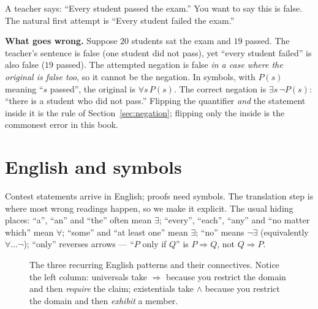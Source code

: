 \begin{example}\label{ex:naive-negation}
A teacher says: ``Every student passed the exam.'' You want to say this is false. The
natural first attempt is ``Every student failed the exam.''
\par\smallskip
\textbf{What goes wrong.} Suppose $20$ students sat the exam and $19$ passed. The teacher's
sentence is false (one student did not pass), yet ``every student failed'' is also false
($19$ passed). The attempted negation is false \emph{in a case where the original is false too},
so it cannot be the negation. In symbols, with $P(s)$ meaning ``$s$ passed'', the original is
$\forall s\,P(s)$. The correct negation is $\exists s\,\neg P(s)$: ``there is a student who did
not pass.'' Flipping the quantifier \emph{and} the statement inside it is the rule of
Section~\ref{sec:negation}; flipping only the inside is the commonest error in this book.
\end{example}

\section{English and symbols}\label{sec:english}

Contest statements arrive in English; proofs need symbols. The translation step is
where most wrong readings happen, so we make it explicit. The usual hiding places:
``a'', ``an'' and ``the'' often mean $\exists$; ``every'', ``each'', ``any'' and
``no matter which'' mean $\forall$; ``some'' and ``at least one'' mean $\exists$;
``no'' means $\lnot\exists$ (equivalently $\forall\dots\lnot$); ``only'' reverses
arrows --- ``$P$ only if $Q$'' is $P \Rightarrow Q$, not $Q \Rightarrow P$.

\begin{figure}[ht]\centering

\caption{The three recurring English patterns and their connectives.
Notice the left column: universals take $\Rightarrow$ because you restrict
the domain and then \emph{require} the claim; existentials take $\land$
because you restrict the domain and then \emph{exhibit} a member.}
\label{fig:flow}
\end{figure}

